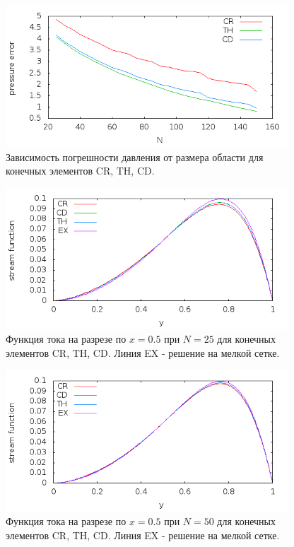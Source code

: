 \documentclass[12pt]{article}
\begin{document}
\begin{figure}
	\begin{center}
		\includegraphics[width=400px]{pics/p_err}
		\caption{Зависимость погрешности давления от размера области для конечных элементов CR, TH, CD.}
		\label{fg:p_err}
	\end{center}
\end{figure}

\begin{figure}
	\begin{center}
		\includegraphics[width=400px]{pics/psi_25}
		\caption{Функция тока на разрезе по $x=0.5$ при $N=25$ для конечных элементов CR, TH, CD. Линия EX - решение на мелкой сетке.}
		\label{fg:psi_25}
	\end{center}
\end{figure}

\begin{figure}
	\begin{center}
		\includegraphics[width=400px]{pics/psi_50}
		\caption{Функция тока на разрезе по $x=0.5$ при $N=50$ для конечных элементов CR, TH, CD. Линия EX - решение на мелкой сетке.}
		\label{fg:psi_50}
	\end{center}
\end{figure}
\end{document}

